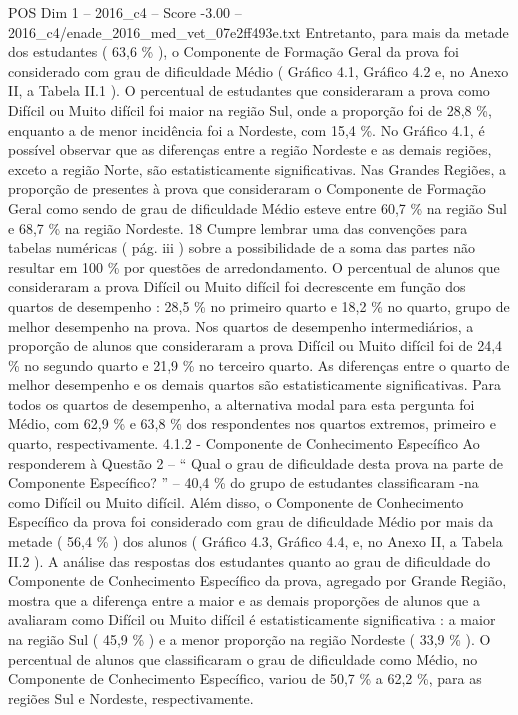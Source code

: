 \begin{textsample}{POS Dim 1 – 2016\_c4 – Score -3.00 – 2016\_c4/enade\_2016\_med\_vet\_07e2ff493e.txt}
Entretanto, para mais da metade dos estudantes ( 63,6 \% ), o Componente de Formação Geral da prova foi considerado com grau de dificuldade Médio ( Gráfico 4.1, Gráfico 4.2 e, no Anexo II, a Tabela II.1 ).
O percentual de estudantes que consideraram a prova como Difícil ou Muito difícil foi maior na região Sul, onde a proporção foi de 28,8 \%, enquanto a de menor incidência foi a Nordeste, com 15,4 \%.
No Gráfico 4.1, é possível observar que as diferenças entre a região Nordeste e as demais regiões, exceto a região Norte, são estatisticamente significativas.
Nas Grandes Regiões, a proporção de presentes à prova que consideraram o Componente de Formação Geral como sendo de grau de dificuldade Médio esteve entre 60,7 \% na região Sul e 68,7 \% na região Nordeste. 18 Cumpre lembrar uma das convenções para tabelas numéricas ( pág. iii ) sobre a possibilidade de a soma das partes não resultar em 100 \% por questões de arredondamento.
O percentual de alunos que consideraram a prova Difícil ou Muito difícil foi decrescente em função dos quartos de desempenho : 28,5 \% no primeiro quarto e 18,2 \% no quarto, grupo de melhor desempenho na prova.
Nos quartos de desempenho intermediários, a proporção de alunos que consideraram a prova Difícil ou Muito difícil foi de 24,4 \% no segundo quarto e 21,9 \% no terceiro quarto.
As diferenças entre o quarto de melhor desempenho e os demais quartos são estatisticamente significativas.
Para todos os quartos de desempenho, a alternativa modal para esta pergunta foi Médio, com 62,9 \% e 63,8 \% dos respondentes nos quartos extremos, primeiro e quarto, respectivamente. 4.1.2 - Componente de Conhecimento Específico Ao responderem à Questão 2 – “ Qual o grau de dificuldade desta prova na parte de Componente Específico? ” – 40,4 \% do grupo de estudantes classificaram -na como Difícil ou Muito difícil.
Além disso, o Componente de Conhecimento Específico da prova foi considerado com grau de dificuldade Médio por mais da metade ( 56,4 \% ) dos alunos ( Gráfico 4.3, Gráfico 4.4, e, no Anexo II, a Tabela II.2 ).
A análise das respostas dos estudantes quanto ao grau de dificuldade do Componente de Conhecimento Específico da prova, agregado por Grande Região, mostra que a diferença entre a maior e as demais proporções de alunos que a avaliaram como Difícil ou Muito difícil é estatisticamente significativa : a maior na região Sul ( 45,9 \% ) e a menor proporção na região Nordeste ( 33,9 \% ).
O percentual de alunos que classificaram o grau de dificuldade como Médio, no Componente de Conhecimento Específico, variou de 50,7 \% a 62,2 \%, para as regiões Sul e Nordeste, respectivamente.

\end{textsample}
